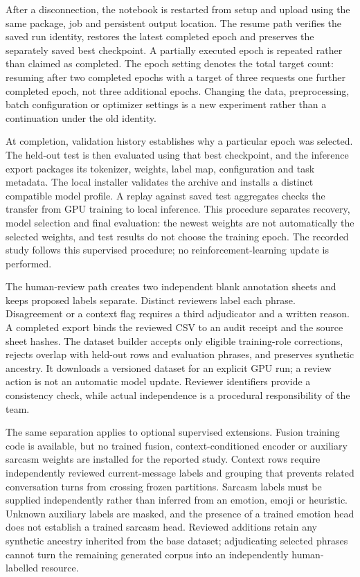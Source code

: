 \documentclass[journal]{IEEEtran}
\begin{document}
After a disconnection, the notebook is restarted from setup and upload using the same package, job and persistent output location. The resume path verifies the saved run identity, restores the latest completed epoch and preserves the separately saved best checkpoint. A partially executed epoch is repeated rather than claimed as completed. The epoch setting denotes the total target count: resuming after two completed epochs with a target of three requests one further completed epoch, not three additional epochs. Changing the data, preprocessing, batch configuration or optimizer settings is a new experiment rather than a continuation under the old identity.

At completion, validation history establishes why a particular epoch was selected. The held-out test is then evaluated using that best checkpoint, and the inference export packages its tokenizer, weights, label map, configuration and task metadata. The local installer validates the archive and installs a distinct compatible model profile. A replay against saved test aggregates checks the transfer from GPU training to local inference. This procedure separates recovery, model selection and final evaluation: the newest weights are not automatically the selected weights, and test results do not choose the training epoch. The recorded study follows this supervised procedure; no reinforcement-learning update is performed.

The human-review path creates two independent blank annotation sheets and keeps proposed labels separate. Distinct reviewers label each phrase. Disagreement or a context flag requires a third adjudicator and a written reason. A completed export binds the reviewed CSV to an audit receipt and the source sheet hashes. The dataset builder accepts only eligible training-role corrections, rejects overlap with held-out rows and evaluation phrases, and preserves synthetic ancestry. It downloads a versioned dataset for an explicit GPU run; a review action is not an automatic model update. Reviewer identifiers provide a consistency check, while actual independence is a procedural responsibility of the team.

The same separation applies to optional supervised extensions. Fusion training code is available, but no trained fusion, context-conditioned encoder or auxiliary sarcasm weights are installed for the reported study. Context rows require independently reviewed current-message labels and grouping that prevents related conversation turns from crossing frozen partitions. Sarcasm labels must be supplied independently rather than inferred from an emotion, emoji or heuristic. Unknown auxiliary labels are masked, and the presence of a trained emotion head does not establish a trained sarcasm head. Reviewed additions retain any synthetic ancestry inherited from the base dataset; adjudicating selected phrases cannot turn the remaining generated corpus into an independently human-labelled resource.
\end{document}

